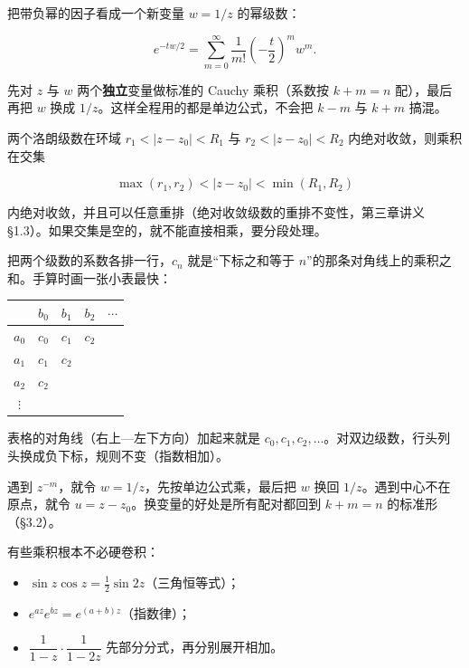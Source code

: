 \documentclass[11pt]{ctexart}
\let\origsubhdr\subhdr
\renewcommand{\subhdr}[1]{\par\needspace{4\baselineskip}\origsubhdr{#1}}
\let\orighdr\hdr
\renewcommand{\hdr}[2]{\par\needspace{9\baselineskip}\orighdr{#1}{#2}}
\begin{document}

把带负幂的因子看成一个新变量 $w=1/z$ 的幂级数：

\[ e^{-tw/2}=\sum_{m=0}^{\infty}\frac{1}{m!}\left(-\frac t2\right)^mw^m . \]

先对 $z$ 与 $w$ 两个\textbf{独立}变量做标准的 Cauchy 乘积（系数按 $k+m=n$ 配），最后再把 $w$ 换成 $1/z$。这样全程用的都是单边公式，不会把 $k-m$ 与 $k+m$ 搞混。


两个洛朗级数在环域 $r_1<|z-z_0|<R_1$ 与 $r_2<|z-z_0|<R_2$ 内绝对收敛，则乘积在交集

\[ \max(r_1,r_2)<|z-z_0|<\min(R_1,R_2) \]

内绝对收敛，并且可以任意重排（绝对收敛级数的重排不变性，第三章讲义 §1.3）。如果交集是空的，就不能直接相乘，要分段处理。




把两个级数的系数各排一行，$c_n$ 就是“下标之和等于 $n$”的那条对角线上的乘积之和。手算时画一张小表最快：

\begin{center}
\begin{tabular}{c|cccc}
 & $b_0$ & $b_1$ & $b_2$ & $\cdots$ \\ \hline
$a_0$ & $c_0$ & $c_1$ & $c_2$ & \\
$a_1$ & $c_1$ & $c_2$ & & \\
$a_2$ & $c_2$ & & & \\
$\vdots$ & & & &
\end{tabular}
\end{center}

表格的对角线（右上—左下方向）加起来就是 $c_0,c_1,c_2,\dots$。对双边级数，行头列头换成负下标，规则不变（指数相加）。


遇到 $z^{-m}$，就令 $w=1/z$，先按单边公式乘，最后把 $w$ 换回 $1/z$。遇到中心不在原点，就令 $u=z-z_0$。换变量的好处是所有配对都回到 $k+m=n$ 的标准形（§3.2）。


有些乘积根本不必硬卷积：

\begin{itemize}
\item $\sin z\cos z=\tfrac12\sin 2z$（三角恒等式）；
\item $e^{az}e^{bz}=e^{(a+b)z}$（指数律）；
\item $\dfrac{1}{1-z}\cdot\dfrac{1}{1-2z}$ 先部分分式，再分别展开相加。
\end{itemize}
\end{document}

